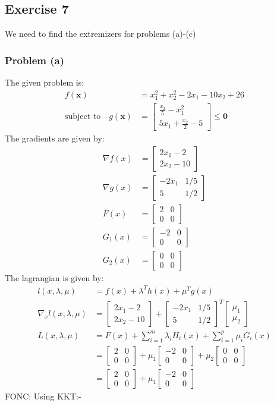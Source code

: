 \documentclass[a4paper,11pt]{article}
\newcommand{\V}[1]{\boldsymbol{#1}}
\newcommand{\mat}[1]{\begin{bmatrix}#1\end{bmatrix}}
\begin{document}
\clearpage
\vspace{2ex}
\subsection*{Exercise 7}
We need to find the extremizers for problems (a)-(c)
\subsubsection*{Problem (a)}
The given problem is:
\begin{align*}
 f(\V{x}) &= x_1^2 + x_2^2 -2x_1 -10x_2 +26\\
 \text{subject to}\quad g(\V{x})&= \mat{\frac{x_2}{5}-x_1^2\\ 5x_1 +\frac{x_2}{2}-5} \leq \V{0}
\end{align*}
The gradients are given by:
\begin{align*}
 \nabla f(x) &= \mat{2x_1 -2\\ 2x_2-10}\\
 \nabla g(x) &= \mat{-2x_1 & 1/5\\ 5&  1/2}\\
 F(x) &= \mat{2&0\\0&0}\\
 G_1(x) &= \mat{-2 & 0\\ 0& 0}\\
 G_2(x) &= \mat{0 & 0\\ 0 &0}
\end{align*}
The lagrangian is given by:
\begin{align*}
 l(x,\lambda,\mu) &= f(x) + \lambda^Th(x) + \mu^Tg(x)\\
 \nabla_x l(x,\lambda,\mu) &= \mat{2x_1 -2\\ 2x_2-10} +
 \mat{-2x_1 & 1/5\\ 5& 1/2}^T\mat{\mu_1\\ \mu_2}\\
 L(x,\lambda,\mu)&= F(x) + \sum_{i=1}^{m}\lambda_i H_i(x) + \sum_{i=1}^{p}\mu_i G_i(x)\\
 &=  \mat{2&0\\0&0} +\mu_1\mat{-2 & 0\\ 0& 0} + \mu_2\mat{0 & 0\\ 0 &0}\\
 &= \mat{2&0\\0&0} +\mu_1\mat{-2 & 0\\ 0& 0}
\end{align*}
FONC: Using KKT:-\\
\end{document}
